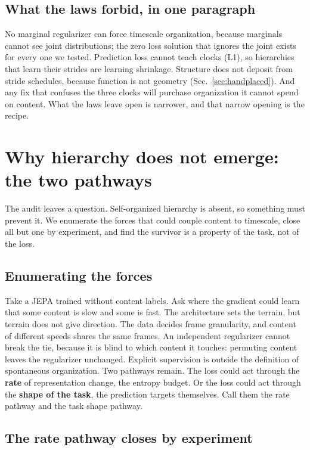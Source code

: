 \documentclass[11pt]{article}
\newcommand{\term}[1]{\textbf{#1}}
\begin{document}
\subsection{What the laws forbid, in one paragraph}

No marginal regularizer can force timescale organization, because marginals cannot see joint distributions; the zero loss solution that ignores the joint exists for every one we tested.
Prediction loss cannot teach clocks (L1), so hierarchies that learn their strides are learning shrinkage.
Structure does not deposit from stride schedules, because function is not geometry (Sec.~\ref{sec:handplaced}).
And any fix that confuses the three clocks will purchase organization it cannot spend on content.
What the laws leave open is narrower, and that narrow opening is the recipe.

\section{Why hierarchy does not emerge: the two pathways}
\label{sec:mechanism}

The audit leaves a question.
Self-organized hierarchy is absent, so something must prevent it.
We enumerate the forces that could couple content to timescale, close all but one by experiment, and find the survivor is a property of the task, not of the loss.

\subsection{Enumerating the forces}

Take a JEPA trained without content labels.
Ask where the gradient could learn that some content is slow and some is fast.
The architecture sets the terrain, but terrain does not give direction.
The data decides frame granularity, and content of different speeds shares the same frames.
An independent regularizer cannot break the tie, because it is blind to which content it touches: permuting content leaves the regularizer unchanged.
Explicit supervision is outside the definition of spontaneous organization.
Two pathways remain.
The loss could act through the \term{rate} of representation change, the entropy budget.
Or the loss could act through the \term{shape of the task}, the prediction targets themselves.
Call them the rate pathway and the task shape pathway.

\subsection{The rate pathway closes by experiment}
\label{sec:rate}
\end{document}
